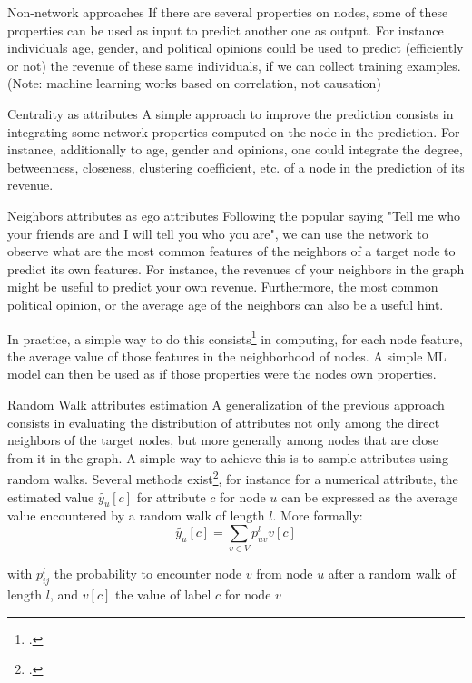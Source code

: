\documentclass[a4paper,11pt]{book}
\begin{document}
\begin{textbox}{Non-network approaches}
If there are several properties on nodes, some of these properties can be used as input to predict another one as output. For instance individuals age, gender, and political opinions could be used to predict (efficiently or not) the revenue of these same individuals, if we can collect training examples. (Note: machine learning works based on correlation, not causation)
\end{textbox}


\begin{textbox}{Centrality as attributes}
A simple approach to improve the prediction consists in integrating some network properties computed on the node in the prediction. For instance, additionally to age, gender and opinions, one could integrate the degree, betweenness, closeness, clustering coefficient, etc. of a node in the prediction of its revenue. 
\end{textbox}


\begin{textbox}{Neighbors attributes as ego attributes}
Following the popular saying "Tell me who your friends are and I will tell you who you are", we can use the network to observe what are the most common features of the neighbors of a target node to predict its own features. For instance, the revenues of your neighbors in the graph might be useful to predict your own revenue. Furthermore, the most common political opinion, or the average age of the neighbors can also be a useful hint.

In practice, a simple way to do this consists\footcite{bhagat2011node} in computing, for each node feature, the average value of those features in the neighborhood of nodes. A simple ML model can then be used as if those properties were the nodes own properties.
\end{textbox}





\begin{textbox}{Random Walk attributes estimation}
A generalization of the previous approach consists in evaluating the distribution of attributes not only among the direct neighbors of the target nodes, but more generally among nodes that are close from it in the graph. A simple way to achieve this is to sample attributes using random walks. Several methods exist\footcite{bhagat2011node}, for instance for a numerical attribute, the estimated value $\tilde{y_u}[c]$ for attribute $c$ for node $u$ can be expressed as the average value encountered by a random walk of length $l$. More formally:
\[
\tilde{y_u}[c]= \sum_{v \in V}p_{uv}^l v[c]
\]

with $p_{ij}^l$ the probability to encounter node $v$ from node $u$ after a random walk of length $l$, and  $v[c]$ the value of label $c$ for node $v$
\end{textbox}
\end{document}
